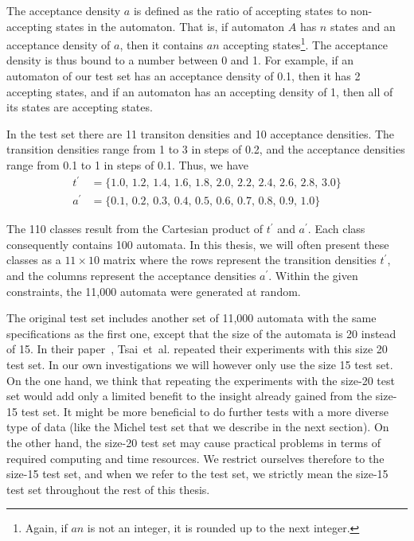 The acceptance density $a$ is defined as the ratio of accepting states to non-accepting states in the automaton. That is, if automaton $A$ has $n$ states and an acceptance density of $a$, then it contains $an$ accepting states\footnote{Again, if $an$ is not an integer, it is rounded up to the next integer.}. The acceptance density is thus bound to a number between 0 and 1. For example, if an automaton of our test set has an acceptance density of 0.1, then it has 2 accepting states, and if an automaton has an accepting density of 1, then all of its states are accepting states.

In the \goal{} test set there are 11 transiton densities and 10 acceptance densities. The transition densities range from 1 to 3 in steps of 0.2, and the acceptance densities range from 0.1 to 1 in steps of 0.1. Thus, we have
\begin{align*}
t^\prime& = \{ 1.0,\,1.2,\,1.4,\,1.6,\,1.8,\,2.0,\,2.2,\,2.4,\,2.6,\,2.8,\,3.0 \} \\
a^\prime & = \{ 0.1,\,0.2,\,0.3,\,0.4,\,0.5,\,0.6,\,0.7,\,0.8,\,0.9,\,1.0 \}
\end{align*}

The 110 classes result from the Cartesian product of $t^\prime$ and $a^\prime$. Each class consequently contains 100 automata. In this thesis, we will often present these classes as a $11 \times 10$ matrix where the rows represent the transition densities $t^\prime$, and the columns represent the acceptance densities $a^\prime$. Within the given constraints, the 11,000 automata were generated at random.

The original \goal{} test set includes another set of 11,000 automata with the same specifications as the first one, except that the size of the automata is 20 instead of 15. In their paper~\cite{2010_tsai}, Tsai~et~al. repeated their experiments with this size 20 test set. In our own investigations we will however only use the size 15 test set. On the one hand, we think that repeating the experiments with the size-20 test set would add only a limited benefit to the insight already gained from the size-15 test set. It might be more beneficial to do further tests with a more diverse type of data (like the Michel test set that we describe in the next section). On the other hand, the size-20 test set may cause practical problems in terms of required computing and time resources. We restrict ourselves therefore to the size-15 test set, and when we refer to the \goal{} test set, we strictly mean the size-15 test set throughout the rest of this thesis.

